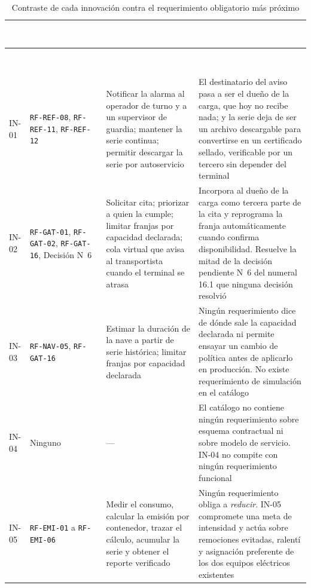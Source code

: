 \begin{longtable}{@{}>{\raggedright\arraybackslash}p{1.5cm}>{\raggedright\arraybackslash}p{3.1cm}>{\raggedright\arraybackslash}p{4.6cm}>{\raggedright\arraybackslash}p{6.2cm}@{}}
\caption{Contraste de cada innovación contra el requerimiento obligatorio más
próximo}\label{tab:nosolapamiento}\\
\toprule
\rowcolor{terabyteFondo}
\textcolor{white}{\bfseries ID} &
\textcolor{white}{\bfseries Requerimiento más próximo} &
\textcolor{white}{\bfseries Qué obliga ese requerimiento} &
\textcolor{white}{\bfseries Qué agrega la innovación} \\
\midrule
\endfirsthead
\toprule
\rowcolor{terabyteFondo}
\textcolor{white}{\bfseries ID} &
\textcolor{white}{\bfseries Requerimiento más próximo} &
\textcolor{white}{\bfseries Qué obliga ese requerimiento} &
\textcolor{white}{\bfseries Qué agrega la innovación} \\
\midrule
\endhead
\bottomrule
\endfoot
IN-01 & \texttt{RF-REF-08}, \texttt{RF-REF-11}, \texttt{RF-REF-12} &
Notificar la alarma al operador de turno y a un supervisor de guardia; mantener
la serie continua; permitir descargar la serie por autoservicio &
El destinatario del aviso pasa a ser el dueño de la carga, que hoy no recibe
nada; y la serie deja de ser un archivo descargable para convertirse en un
certificado sellado, verificable por un tercero sin depender del terminal \\
\addlinespace
IN-02 & \texttt{RF-GAT-01}, \texttt{RF-GAT-02}, \texttt{RF-GAT-16}, Decisión
N\textdegree{}~6 &
Solicitar cita; priorizar a quien la cumple; limitar franjas por capacidad
declarada; cola virtual que avisa al transportista cuando el terminal se atrasa &
Incorpora al dueño de la carga como tercera parte de la cita y reprograma la
franja automáticamente cuando confirma disponibilidad. Resuelve la mitad de la
decisión pendiente N\textdegree{}~6 del numeral 16.1 que ninguna decisión
resolvió \\
\addlinespace
IN-03 & \texttt{RF-NAV-05}, \texttt{RF-GAT-16} &
Estimar la duración de la nave a partir de serie histórica; limitar franjas por
capacidad declarada &
Ningún requerimiento dice de dónde sale la capacidad declarada ni permite
ensayar un cambio de política antes de aplicarlo en producción. No existe
requerimiento de simulación en el catálogo \\
\addlinespace
IN-04 & Ninguno & --- &
El catálogo no contiene ningún requerimiento sobre esquema contractual ni sobre
modelo de servicio. IN-04 no compite con ningún requerimiento funcional \\
\addlinespace
IN-05 & \texttt{RF-EMI-01} a \texttt{RF-EMI-06} &
Medir el consumo, calcular la emisión por contenedor, trazar el cálculo,
acumular la serie y obtener el reporte verificado &
Ningún requerimiento obliga a \emph{reducir}. IN-05 compromete una meta de
intensidad y actúa sobre remociones evitadas, ralentí y asignación preferente
de los dos equipos eléctricos existentes \\
\end{longtable}


